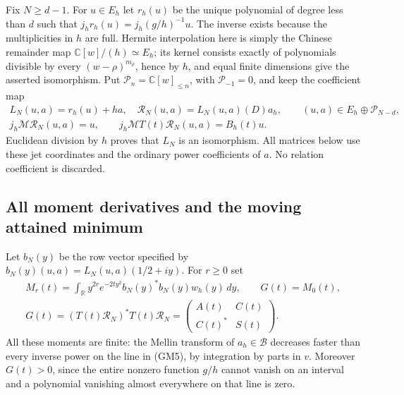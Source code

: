 \documentclass[11pt]{article}
\theoremstyle{remark}\newtheorem{remark}[theorem]{Remark}
\begin{document}
Fix $N\geq d-1$.  For $u\in E_h$ let $r_h(u)$ be the unique
polynomial of degree less than $d$ such that
$j_h r_h(u)=j_h(g/h)^{-1}u$.  The inverse exists because the
multiplicities in $h$ are full.  Hermite interpolation here is simply
the Chinese remainder map $\mathbb C[w]/(h)\simeq E_h$; its kernel
consists exactly of polynomials divisible by every
$(w-\rho)^{m_\rho}$, hence by $h$, and equal finite dimensions give
the asserted isomorphism.  Put $\mathcal P_n=\mathbb C[w]_{\leq n}$,
with $\mathcal P_{-1}=0$, and keep the coefficient map
\begin{equation}\tag{GM4}
 \begin{gathered}
 L_N(u,a)=r_h(u)+ha,\quad
 \mathcal R_N(u,a)=L_N(u,a)(D)a_h,\qquad
 (u,a)\in E_h\oplus\mathcal P_{N-d},\\
 j_h\mathcal M\mathcal R_N(u,a)=u,\qquad
 j_h\mathcal M T(t)\mathcal R_N(u,a)=B_h(t)u.
 \end{gathered}
\end{equation}
Euclidean division by $h$ proves that $L_N$ is an isomorphism.  All
matrices below use these jet coordinates and the ordinary power
coefficients of $a$.  No relation coefficient is discarded.

\subsection{All moment derivatives and the moving attained minimum}

Let $b_N(y)$ be the row vector specified by
$b_N(y)(u,a)=L_N(u,a)(1/2+iy)$.  For $r\geq0$ set
\begin{equation}\tag{GM5}
 \begin{gathered}
 M_r(t)=\int_{\mathbb R}y^{2r}e^{-2ty^2}
                       b_N(y)^*b_N(y)w_h(y)\,dy,\qquad
 G(t)=M_0(t),\\
 G(t)=(T(t)\mathcal R_N)^*T(t)\mathcal R_N
       =\begin{pmatrix}A(t)&C(t)\\ C(t)^*&S(t)\end{pmatrix}.
 \end{gathered}
\end{equation}
All these moments are finite: the Mellin transform of $a_h\in\mathscr B$
decreases faster than every inverse power on the line in (GM5), by
integration by parts in $v$.  Moreover $G(t)>0$, since the entire
nonzero function $g/h$ cannot vanish on an interval and a polynomial
vanishing almost everywhere on that line is zero.
\end{document}

